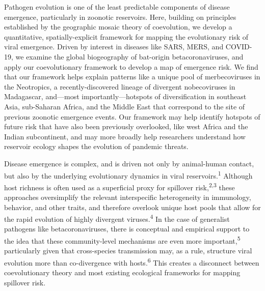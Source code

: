 \documentclass[11pt]{article}
\begin{document}
\vfill
Pathogen evolution is one of the least predictable components of disease
emergence, particularly in zoonotic reservoirs. Here, building on
principles established by the geographic mosaic theory of coevolution,
we develop a quantitative, spatially-explicit framework for mapping the
evolutionary risk of viral emergence. Driven by interest in diseases
like SARS, MERS, and COVID-19, we examine the global biogeography of
bat-origin betacoronaviruses, and apply our coevolutionary framework to
develop a map of emergence risk. We find that our framework helps
explain patterns like a unique pool of merbecoviruses in the Neotropics,
a recently-discovered lineage of divergent nobecoviruses in Madagascar,
and---most importantly---hotspots of diversification in southeast Asia,
sub-Saharan Africa, and the Middle East that correspond to the site of
previous zoonotic emergence events. Our framework may help identify
hotspots of future risk that have also been previously overlooked, like
west Africa and the Indian subcontinent, and may more broadly help
researchers understand how reservoir ecology shapes the evolution of
pandemic threats.



\vfill

\clearpage
\linenumbers
\pagestyle{normal}

Disease emergence is complex, and is driven not only by animal-human
contact, but also by the underlying evolutionary dynamics in viral
reservoirs.\textsuperscript{1} Although host richness is often used as a
superficial proxy for spillover risk,\textsuperscript{2,3} these
approaches oversimplify the relevant interspecific heterogeneity in
immunology, behavior, and other traits, and therefore overlook unique
host pools that allow for the rapid evolution of highly divergent
viruses.\textsuperscript{4} In the case of generalist pathogens like
betacoronaviruses, there is conceptual and empirical support to the idea
that these community-level mechanisms are even more
important,\textsuperscript{5} particularly given that cross-species
transmission may, as a rule, structure viral evolution more than
co-divergence with hosts.\textsuperscript{6} This creates a disconnect
between coevolutionary theory and most existing ecological frameworks
for mapping spillover risk.
\end{document}

